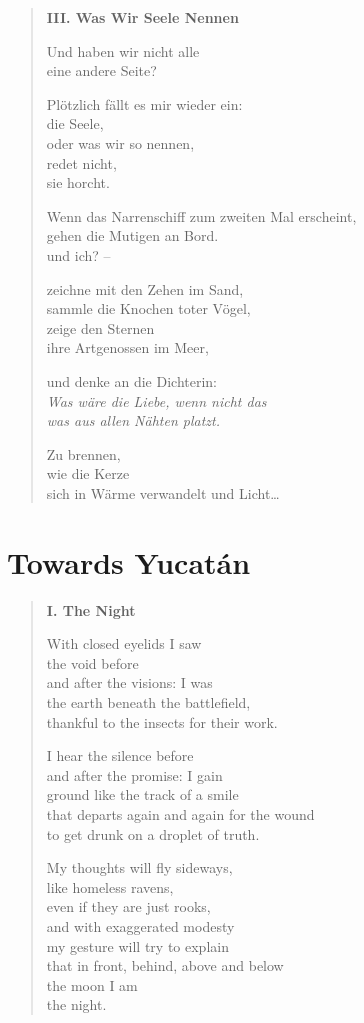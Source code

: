 \begin{verse}
\clearpage

{\bfseries III. Was Wir Seele Nennen}

Und haben wir nicht alle\\
eine andere Seite?

Plötzlich fällt es mir wieder ein:\\
die Seele,\\
oder was wir so nennen,\\
redet nicht,\\
sie horcht.

Wenn das Narrenschiff zum zweiten Mal erscheint,\\
gehen die Mutigen an Bord.\\
und ich? --

zeichne mit den Zehen im Sand,\\
sammle die Knochen toter Vögel,\\
zeige den Sternen\\
ihre Artgenossen im Meer,

und denke an die Dichterin:\\
{\itshape Was wäre die Liebe, wenn nicht das\\
was aus allen Nähten platzt.}

Zu brennen,\\
wie die Kerze\\
sich in Wärme verwandelt und Licht\ldots
\end{verse}


\clearpage

\section{Towards Yucatán}
\label{yucatan}


\begin{verse}

{\bfseries I. The Night}

With closed eyelids I saw\\
the void before\\
and after the visions: I was\\
the earth beneath the battlefield,\\
thankful to the insects for their work.

I hear the silence before\\
and after the promise: I gain\\
ground like the track of a smile\\
that departs again and again for the wound\\
to get drunk on a droplet of truth.

My thoughts will fly sideways,\\
like homeless ravens,\\
even if they are just rooks,\\
and with exaggerated modesty\\
my gesture will try to explain\\
that in front, behind, above and below\\
the moon I am\\
the night.
\end{verse}

